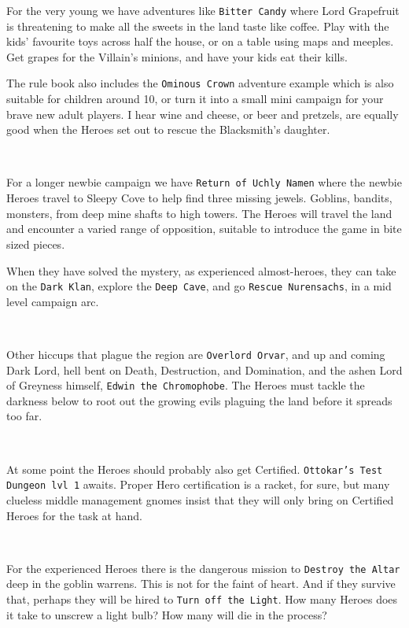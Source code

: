 \noindent
For the very young we have adventures like \texttt{Bitter Candy} where Lord Grapefruit is threatening to make all the sweets in the land taste like coffee. Play with the kids' favourite toys across half the house, or on a table using maps and meeples. Get grapes for the Villain's minions, and have your kids eat their kills.

The rule book also includes the \texttt{Ominous Crown} adventure example which is also suitable for children around 10, or turn it into a small mini campaign for your brave new adult players. I hear wine and cheese, or beer and pretzels, are equally good when the Heroes set out to rescue the Blacksmith's daughter.

\

For a longer newbie campaign we have \texttt{Return of Uchly Namen} where the newbie Heroes travel to Sleepy Cove to help find three missing jewels. Goblins, bandits, monsters, from deep mine shafts to high towers. The Heroes will travel the land and encounter a varied range of opposition, suitable to introduce the game in bite sized pieces.

When they have solved the mystery, as experienced almost-heroes, they can take on the \texttt{Dark Klan}, explore the \texttt{Deep Cave}, and go \texttt{Rescue Nurensachs}, in a mid level campaign arc.

\

Other hiccups that plague the region are \texttt{Overlord Orvar}, and up and coming Dark Lord, hell bent on Death, Destruction, and Domination, and the ashen Lord of Greyness himself, \texttt{Edwin the Chromophobe}. The Heroes must tackle the darkness below to root out the growing evils plaguing the land before it spreads too far.

\

At some point the Heroes should probably also get Certified. \texttt{Ottokar's Test Dungeon lvl 1} awaits. Proper Hero certification is a racket, for sure, but many clueless middle management gnomes insist that they will only bring on Certified Heroes for the task at hand.

\

For the experienced Heroes there is the dangerous mission to \texttt{Destroy the Altar} deep in the goblin warrens. This is not for the faint of heart. And if they survive that, perhaps they will be hired to \texttt{Turn off the Light}. How many Heroes does it take to unscrew a light bulb? How many will die in the process?

\


